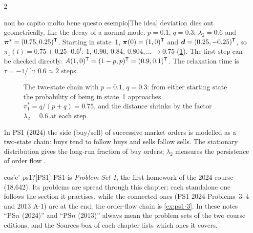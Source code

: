 \begin{paracol}{2}
\begin{answer}{non ho capito molto bene questo esempio}[The idea]
deviation dies out geometrically, like the decay of a normal mode.
$p=0.1$, $q=0.3$: $\lambda_2=0.6$ and $\bm\pi^*=(0.75,0.25)^{\mathsf T}$. Starting in state~1,
$\bm\pi(0)=(1,0)^{\mathsf T}$ and $\bm d=(0.25,-0.25)^{\mathsf T}$, so $\pi_1(t)=0.75+0.25\cdot0.6^t$:
$1,\ 0.90,\ 0.84,\ 0.804,\dots\to0.75$ (\cref{fig:twostate-conv}). The first step can be checked directly: $A(1,0)^{\mathsf T}=(1-p,p)^{\mathsf T}=(0.9,0.1)^{\mathsf T}$.
The relaxation time is $\tau=-1/\ln0.6\approx2$ steps.
\end{answer}
\begin{figure}[ht]
\centering
{}
\caption{The two-state chain with $p=0.1$, $q=0.3$: from either starting state the probability of being
in state~1 approaches $\pi_1^*=q/(p+q)=0.75$, and the distance shrinks by the factor $\lambda_2=0.6$ at each step.}\label{fig:twostate-conv}
\end{figure}

\begin{finance}
In PS1 (2024) the side (buy/sell) of successive market orders is modelled as a two-state chain:
buys tend to follow buys and sells follow sells. The stationary distribution gives the long-run
fraction of buy orders; $\lambda_2$ measures the persistence of order flow .
\end{finance}\begin{answer}{cos'e' ps1?}[PS1]
PS1 is \emph{Problem Set 1}, the first homework of the 2024 course (18.642). Its problems are spread through
this chapter: each standalone one follows the section it practises, while the connected ones (PS1 2024
Problems~3--4 and 2013 A-1) are at the end; the order-flow chain is \cref{ex:ps1-3}. In these notes ``PS$n$ (2024)'' and
``PS$n$ (2013)'' always mean the problem sets of the two course editions, and the Sources box of
each chapter lists which ones it covers.
\end{answer}


\end{paracol}
